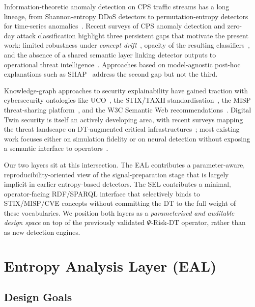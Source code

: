 \documentclass[runningheads]{llncs}
\newcommand{\psiop}{\ensuremath{\Psi}}
\begin{document}
Information-theoretic anomaly detection on CPS traffic streams has a
long lineage, from Shannon-entropy DDoS detectors to permutation-entropy
detectors for time-series anomalies~\cite{bandt2002,pincus1991,kitsune2018}.
Recent surveys of CPS anomaly detection and zero-day attack
classification highlight three persistent gaps that motivate the
present work: limited robustness under \emph{concept
drift}~\cite{gama2014}, opacity of the resulting
classifiers~\cite{adadi2018,capuano2022}, and the absence of a
shared semantic layer linking detector outputs to operational threat
intelligence~\cite{mlcps2024,zeroday2022,cicids2017}. Approaches based
on model-agnostic post-hoc explanations such as
SHAP~\cite{lundberg2017} address the second gap but not the third.

Knowledge-graph approaches to security explainability have gained
traction with cybersecurity ontologies like
UCO~\cite{uco2016,ckgsurvey2023}, the STIX/TAXII
standardisation~\cite{stix21}, the MISP threat-sharing
platform~\cite{misp}, and the W3C Semantic Web
recommendations~\cite{owl2,sparql11}. Digital Twin security is itself
an actively developing area, with recent surveys mapping the threat
landscape on DT-augmented critical
infrastructures~\cite{alcaraz2022,dtsec2023}; most existing work
focuses either on simulation fidelity or on neural detection without
exposing a semantic interface to operators~\cite{hdir2,paper3}.

Our two layers sit at this intersection. The EAL contributes a
parameter-aware, reproducibility-oriented view of the signal-preparation
stage that is largely implicit in earlier entropy-based detectors. The
SEL contributes a minimal, operator-facing RDF/SPARQL interface that
selectively binds to STIX/MISP/CVE concepts without committing the DT to
the full weight of these vocabularies. We position both layers as a
\emph{parameterised and auditable design space} on top of the previously
validated $\psiop$-Risk-DT operator, rather than as new detection
engines.

\section{Entropy Analysis Layer (EAL)}
\label{sec:eal}

\subsection{Design Goals}
\end{document}
